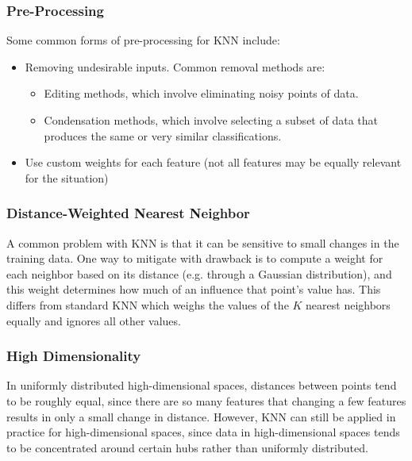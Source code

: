 \documentclass[12pt]{article}
\begin{document}
        \subsubsection{Pre-Processing}
            Some common forms of pre-processing for KNN include:
            \begin{itemize}
              \item Removing undesirable inputs. Common removal methods are:
                \begin{itemize}
                  \item Editing methods, which involve eliminating noisy points of data.
                  \item Condensation methods, which involve selecting a subset of data that produces the same or very similar classifications.
                \end{itemize}
              \item Use custom weights for each feature (not all features may be equally relevant for the situation)
            \end{itemize}

        \subsubsection{Distance-Weighted Nearest Neighbor}
            A common problem with KNN is that it can be sensitive to small changes in the training data. One way to mitigate with drawback is to compute a weight for
            each neighbor based on its distance (e.g. through a Gaussian distribution), and this weight determines how much of an influence that point's value has.
            This differs from standard KNN which weighs the values of the $K$ nearest neighbors equally and ignores all other values.

        \subsubsection{High Dimensionality}
            In uniformly distributed high-dimensional spaces, distances between points tend to be roughly equal, since there are so many features that changing a few
            features results in only a small change in distance. However, KNN can still be applied in practice for high-dimensional spaces, since data in high-dimensional
            spaces tends to be concentrated around certain hubs rather than uniformly distributed.
\end{document}
